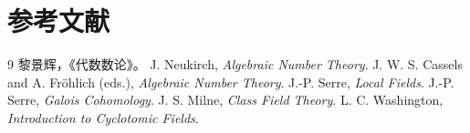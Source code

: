 \documentclass[11pt,a4paper,openany]{ctexbook}
\numberwithin{equation}{chapter}
\theoremstyle{plain}
\theoremstyle{definition}
\theoremstyle{remark}
\begin{document}
\frontmatter
\tableofcontents

\mainmatter
\setcounter{chapter}{-1}














\backmatter
\chapter*{参考文献}
\begin{thebibliography}{9}
 黎景辉，《代数数论》。
 J. Neukirch, \emph{Algebraic Number Theory}.
 J. W. S. Cassels and A. Fröhlich (eds.), \emph{Algebraic Number Theory}.
 J.-P. Serre, \emph{Local Fields}.
 J.-P. Serre, \emph{Galois Cohomology}.
 J. S. Milne, \emph{Class Field Theory}.
 L. C. Washington, \emph{Introduction to Cyclotomic Fields}.
\end{thebibliography}
\end{document}
